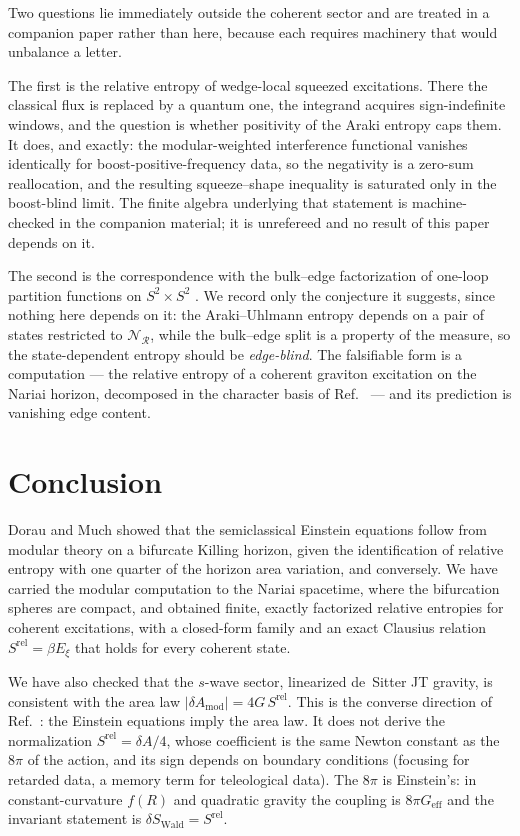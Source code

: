 \documentclass[11pt]{article}
\newcommand{\Srel}{S^{\mathrm{rel}}}
\newcommand{\Nariai}{Nariai}
\begin{document}
Two questions lie immediately outside the coherent sector and are treated in a companion paper \cite{SuppNariai} rather than here, because each requires machinery that would unbalance a letter.

The first is the relative entropy of wedge-local squeezed excitations. There the classical flux is replaced by a quantum one, the integrand acquires sign-indefinite windows, and the question is whether positivity of the Araki entropy caps them. It does, and exactly: the modular-weighted interference functional vanishes identically for boost-positive-frequency data, so the negativity is a zero-sum reallocation, and the resulting squeeze--shape inequality is saturated only in the boost-blind limit. The finite algebra underlying that statement is machine-checked in the companion material; it is unrefereed and no result of this paper depends on it.

The second is the correspondence with the bulk--edge factorization of one-loop partition functions on $S^2 \times S^2$ \cite{LawLochabPRL,LawLochabPRD}. We record only the conjecture it suggests, since nothing here depends on it: the Araki--Uhlmann entropy depends on a pair of states restricted to $\mathscr{N}_{\mathcal{R}}$, while the bulk--edge split is a property of the measure, so the state-dependent entropy should be \emph{edge-blind}. The falsifiable form is a computation --- the relative entropy of a coherent graviton excitation on the \Nariai{} horizon, decomposed in the character basis of Ref.~\cite{Mukherjee} --- and its prediction is vanishing edge content.

\section{Conclusion}
\label{sec:conclusion}

Dorau and Much showed that the semiclassical Einstein equations follow from modular theory on a bifurcate Killing horizon, given the identification of relative entropy with one quarter of the horizon area variation, and conversely. We have carried the modular computation to the Nariai spacetime, where the bifurcation spheres are compact, and obtained finite, exactly factorized relative entropies for coherent excitations, with a closed-form family and an exact Clausius relation $\Srel=\beta E_\xi$ that holds for every coherent state.

We have also checked that the $s$-wave sector, linearized de~Sitter JT gravity, is consistent with the area law $|\delta A_{\mathrm{mod}}|=4G\,\Srel$. This is the converse direction of Ref.~\cite{DorauMuch}: the Einstein equations imply the area law. It does not derive the normalization $\Srel=\delta A/4$, whose coefficient is the same Newton constant as the $8\pi$ of the action, and its sign depends on boundary conditions (focusing for retarded data, a memory term for teleological data). The $8\pi$ is Einstein's: in constant-curvature $f(R)$ and quadratic gravity the coupling is $8\pi G_{\mathrm{eff}}$ and the invariant statement is $\delta S_{\mathrm{Wald}}=\Srel$.
\end{document}

